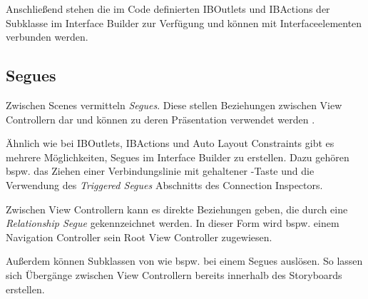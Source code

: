 \documentclass[parskip=half, final]{scrreprt}
\begin{document}
Anschließend stehen die im Code definierten IBOutlets und IBActions der  Subklasse im Interface Builder zur Verfügung und können mit Interfaceelementen verbunden werden.

\subsection{Segues}

Zwischen Scenes vermitteln \emph{Segues}. Diese stellen Beziehungen zwischen View Controllern dar und können zu deren Präsentation verwendet werden .


Ähnlich wie bei IBOutlets, IBActions und Auto Layout Constraints gibt es mehrere Möglichkeiten, Segues im Interface Builder zu erstellen. Dazu gehören bspw. das Ziehen einer Verbindungslinie mit gehaltener \keys{\ctrl}-Taste und die Verwendung des \emph{Triggered Segues} Abschnitts des Connection Inspectors.

Zwischen View Controllern kann es direkte Beziehungen geben, die durch eine \emph{Relationship Segue} gekennzeichnet werden. In dieser Form wird bspw. einem Navigation Controller sein Root View Controller zugewiesen.

Außerdem können Subklassen von  wie bspw.  bei einem  Segues auslösen. So lassen sich Übergänge zwischen View Controllern bereits innerhalb des Storyboards erstellen.
\end{document}
